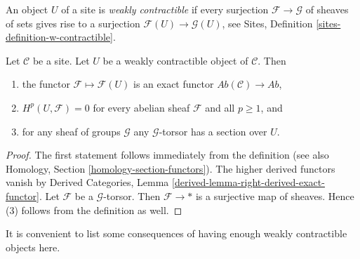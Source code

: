 \noindent
An object $U$ of a site is {\it weakly contractible} if every surjection
$\mathcal{F} \to \mathcal{G}$ of sheaves of sets gives rise to a surjection
$\mathcal{F}(U) \to \mathcal{G}(U)$, see
Sites, Definition \ref{sites-definition-w-contractible}.

\begin{lemma}
\label{lemma-w-contractible}
Let $\mathcal{C}$ be a site. Let $U$ be a weakly contractible
object of $\mathcal{C}$. Then
\begin{enumerate}
\item the functor $\mathcal{F} \mapsto \mathcal{F}(U)$ is an exact
functor $\textit{Ab}(\mathcal{C}) \to \textit{Ab}$,
\item $H^p(U, \mathcal{F}) = 0$
for every abelian sheaf $\mathcal{F}$ and all $p \geq 1$, and
\item for any sheaf of groups $\mathcal{G}$ any $\mathcal{G}$-torsor
has a section over $U$.
\end{enumerate}
\end{lemma}

\begin{proof}
The first statement follows immediately from the definition
(see also Homology, Section \ref{homology-section-functors}).
The higher derived functors vanish by
Derived Categories, Lemma \ref{derived-lemma-right-derived-exact-functor}.
Let $\mathcal{F}$ be a $\mathcal{G}$-torsor. Then $\mathcal{F} \to *$
is a surjective map of sheaves. Hence (3) follows from the
definition as well.
\end{proof}

\noindent
It is convenient to list some consequences of having enough
weakly contractible objects here.

